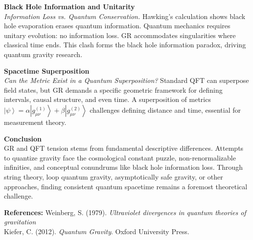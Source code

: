 \begin{technical}
    \noindent\textbf{Black Hole Information and Unitarity}\\[0.25em]
    \textit{Information Loss vs. Quantum Conservation.}
    Hawking's calculation shows black hole evaporation erases quantum information. Quantum mechanics requires unitary evolution: no information loss. GR accommodates singularities where classical time ends. This clash forms the black hole information paradox, driving quantum gravity research.

    \noindent\textbf{Spacetime Superposition}\\[0.25em]
    \textit{Can the Metric Exist in a Quantum Superposition?}
    Standard QFT can superpose field states, but GR demands a specific geometric framework for defining intervals, causal structure, and even time. A superposition of metrics $\left|\psi\right> = \alpha \left|g_{\mu\nu}^{(1)}\right> + \beta \left|g_{\mu\nu}^{(2)}\right>$ challenges defining distance and time, essential for measurement theory.

    \noindent\textbf{Conclusion}\\[0.25em]
    GR and QFT tension stems from fundamental descriptive differences. Attempts to quantize gravity face the cosmological constant puzzle, non-renormalizable infinities, and conceptual conundrums like black hole information loss. Through string theory, loop quantum gravity, asymptotically safe gravity, or other approaches, finding consistent quantum spacetime remains a foremost theoretical challenge.

    \vspace{0.25em}
    \noindent\textbf{References:}
    Weinberg, S. (1979). \textit{Ultraviolet divergences in quantum theories of gravitation}\\
    Kiefer, C. (2012). \textit{Quantum Gravity}. Oxford University Press.

\end{technical}
